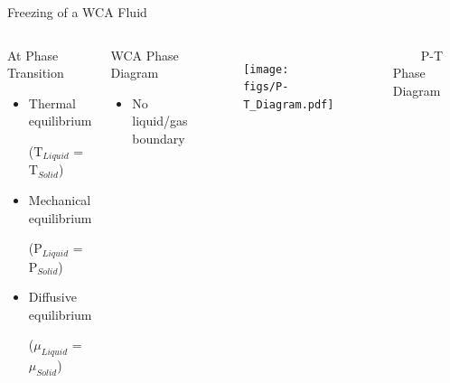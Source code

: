 \documentclass{beamer}
\begin{document}
\begin{frame}{Freezing of a WCA Fluid}
	\begin{columns}[t]
	    \vspace{-0.5em}
         \begin{block}{At Phase Transition}
		     \begin{itemize}
				\item Thermal equilibrium 
				
				($\text{T}_{Liquid}$ = $\text{T}_{Solid}$)
			    \item Mechanical equilibrium 
			    
			    ($\text{P}_{Liquid}$ = $\text{P}_{Solid}$)
				\item Diffusive equilibrium 
				
				($\mu_{Liquid}$ = $\mu_{Solid}$)
			\end{itemize}		
		\end{block}	
		\begin{block}{WCA Phase Diagram}
		     \begin{itemize}
				\item No liquid/gas boundary				
			  \end{itemize}				 
		\end{block}	
	    \vspace{-1.5em}
		\begin{figure}
            \centering
            \texttt{[image: figs/P-T\_Diagram.pdf]}
         \end{figure} 
	    \vspace{-1em}                  
         $~~~~~~~~~~$P-T Phase Diagram
	\end{columns}
    \vspace{+1em}	
\end{frame}



				
\end{document}
